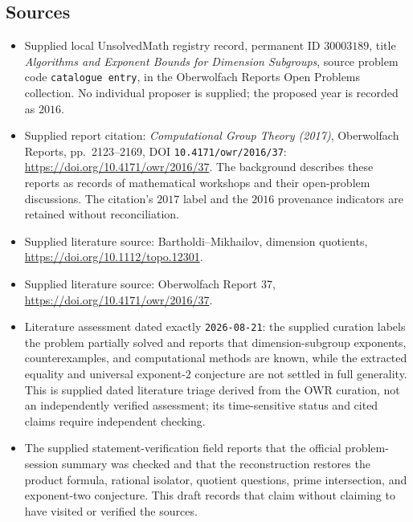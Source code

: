 \documentclass[11pt]{article}
\begin{document}
\subsection{Sources}
\begin{itemize}
\item Supplied local UnsolvedMath registry record, permanent ID \(30003189\), title \emph{Algorithms and Exponent Bounds for Dimension Subgroups}, source problem code \texttt{catalogue entry}, in the Oberwolfach Reports Open Problems collection. No individual proposer is supplied; the proposed year is recorded as \(2016\).
\item Supplied report citation: \emph{Computational Group Theory (2017)}, Oberwolfach Reports, pp.~2123--2169, DOI \texttt{10.4171/owr/2016/37}: \url{https://doi.org/10.4171/owr/2016/37}. The background describes these reports as records of mathematical workshops and their open-problem discussions. The citation's \(2017\) label and the \(2016\) provenance indicators are retained without reconciliation.
\item Supplied literature source: Bartholdi--Mikhailov, dimension quotients, \url{https://doi.org/10.1112/topo.12301}.
\item Supplied literature source: Oberwolfach Report 37, \url{https://doi.org/10.4171/owr/2016/37}.
\item Literature assessment dated exactly \texttt{2026-08-21}: the supplied curation labels the problem partially solved and reports that dimension-subgroup exponents, counterexamples, and computational methods are known, while the extracted equality and universal exponent-\(2\) conjecture are not settled in full generality. This is supplied dated literature triage derived from the OWR curation, not an independently verified assessment; its time-sensitive status and cited claims require independent checking.
\item The supplied statement-verification field reports that the official problem-session summary was checked and that the reconstruction restores the product formula, rational isolator, quotient questions, prime intersection, and exponent-two conjecture. This draft records that claim without claiming to have visited or verified the sources.
\end{itemize}
\end{document}
